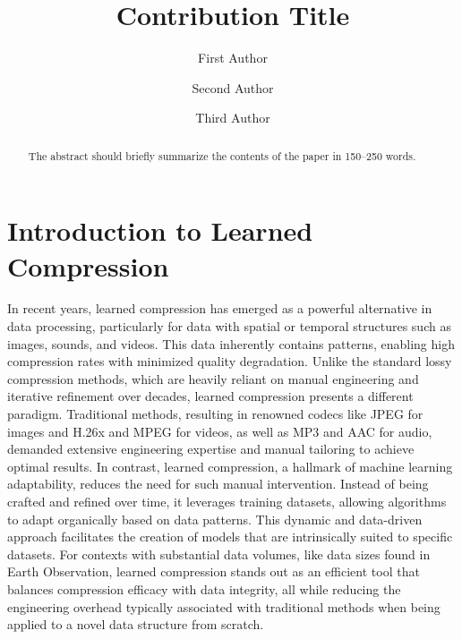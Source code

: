 \documentclass[runningheads]{llncs}
\begin{document}
%
\title{Contribution Title}
%
%
\author{First Author \and
Second Author \and
Third Author}
%
%
%
\maketitle              %
%
\begin{abstract}
The abstract should briefly summarize the contents of the paper in
150--250 words.

\end{abstract}
%
%
%

\section{Introduction to Learned Compression}
In recent years, learned compression has emerged as a powerful alternative in data processing, 
particularly for data with spatial or temporal structures such as images, sounds, and videos. This data
inherently contains patterns, enabling high compression rates with minimized quality degradation. 
Unlike the standard lossy compression methods, which are heavily reliant on manual engineering and
iterative refinement over decades, learned compression presents a different paradigm. Traditional
methods, resulting in renowned codecs like JPEG for images and H.26x and MPEG for videos, as well
as MP3 and AAC for audio, demanded extensive engineering expertise and manual tailoring to achieve
optimal results. In contrast, learned compression, a hallmark of machine learning adaptability, reduces the need
for such manual intervention. Instead of being crafted and refined over time, it
leverages training datasets, allowing algorithms to adapt organically based on data patterns.
This dynamic and data-driven approach facilitates the creation of models that are intrinsically suited to specific
datasets. For contexts with substantial data volumes, like data sizes found in Earth Observation, 
learned compression stands out as an efficient tool that balances compression efficacy with data
integrity, all while reducing the engineering overhead typically associated with traditional methods
when being applied to a novel data structure from scratch. 
\end{document}
